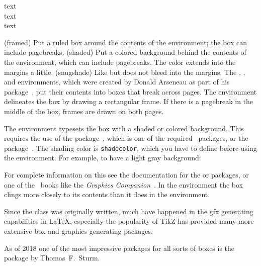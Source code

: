 \begin{syntax}
 text  \\
 text  \\
 text  \\
\end{syntax}
\glossary(framed)%
  {}%
  {Put a ruled box around the contents of the environment; the box can include
   pagebreaks.}
\glossary(shaded)%
  {}%
  {Put a colored background behind the contents of the environment, which
   can include pagebreaks. The color extends into the margins a little.}
\glossary(snugshade)%
  {}%
  {Like  but does not bleed into the margins.}
The , , and   
environments, which were created by Donald Arseneau 
as part of his  package~\cite{FRAMED},
put their contents
into boxes that break across pages. 
The  environment delineates
the box by drawing a rectangular frame. If there is a pagebreak in
the middle of the box, frames are drawn on both pages.

    The  environment typesets the box with a 
shaded or
colored background. This requires the use of the  
package~\cite{COLOR}, which is one of the required \ltx\ packages,
or the  package~\cite{XCOLOR}.
The shading color is \texttt{shadecolor}, which you have to define before
using the environment. For
example, to have a light gray background:
\begin{lcode}
\end{lcode}
For complete information on this see the documentation for the
 or  packages, or one of the \ltx\ books like the
\textit{Graphics Companion}~\cite{GCOMPANION}.
In the  environment the box clings more closely to its
contents than it does in the  environment.

\begin{recommended}
  Since the class was originally written, much have happened in the
  gfx generating capabilities in LaTeX, especially the popularity of
  TikZ has provided many more extensive box and graphics generating
  packages.

  As of 2018 one of the most impressive packages for all sorts of
  boxes is the  package by Thomas~F.~Sturm.
\end{recommended}



